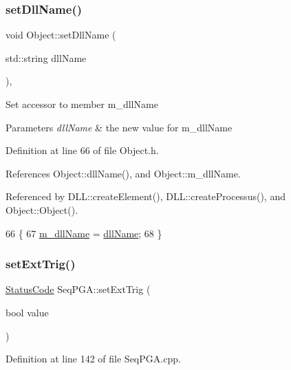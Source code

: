 \subsubsection{\texorpdfstring{set\+Dll\+Name()}{setDllName()}}
{\footnotesize\ttfamily void Object\+::set\+Dll\+Name (\begin{DoxyParamCaption}\item[{std\+::string}]{dll\+Name }\end{DoxyParamCaption})\hspace{0.3cm}{\ttfamily [inline]}, {\ttfamily [inherited]}}

Set accessor to member m\+\_\+dll\+Name 
\begin{DoxyParams}{Parameters}
{\em dll\+Name} & the new value for m\+\_\+dll\+Name \\
\hline
\end{DoxyParams}


Definition at line 66 of file Object.\+h.



References Object\+::dll\+Name(), and Object\+::m\+\_\+dll\+Name.



Referenced by D\+L\+L\+::create\+Element(), D\+L\+L\+::create\+Processus(), and Object\+::\+Object().


\begin{DoxyCode}
66                                       \{
67     \hyperlink{classObject_a01afbeacebb8db6831559972ec362eb3}{m\_dllName} = \hyperlink{classObject_a2e3947f2870094c332d7454117f3ec63}{dllName};
68   \}
\end{DoxyCode}
\mbox{\label{classSeqPGA_a9744b6cff04738474556cc2153af19de}} 
\subsubsection{\texorpdfstring{set\+Ext\+Trig()}{setExtTrig()}}
{\footnotesize\ttfamily \hyperlink{classStatusCode}{Status\+Code} Seq\+P\+G\+A\+::set\+Ext\+Trig (\begin{DoxyParamCaption}\item[{bool}]{value }\end{DoxyParamCaption})}



Definition at line 142 of file Seq\+P\+G\+A.\+cpp.



